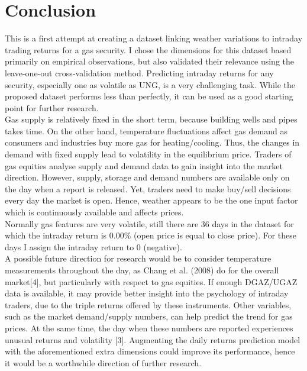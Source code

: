 \documentclass[conference,letterpaper]{IEEEtran}
\begin{document}
\section{Conclusion}
This is a first attempt at creating a dataset linking weather variations to intraday trading returns for a gas security. I chose the dimensions for this
dataset based primarily on empirical observations, but also validated their relevance using the leave-one-out cross-validation method. Predicting intraday
returns for any security, especially one as volatile as UNG, is a very challenging task. While the proposed dataset performs less than perfectly, it can be
used as a good starting point for further research. \\
\indent Gas supply is relatively fixed in the short term, because building wells and pipes takes time. On the other hand,
temperature fluctuations affect gas demand as consumers and industries buy more gas for heating/cooling. Thus, the changes in demand with fixed
supply lead to volatility in the equilibrium price. Traders of gas equities analyse supply and demand data to gain insight into the market direction. However,
supply, storage and demand numbers are available only on the day when a report is released. Yet, traders need to make buy/sell decisions every day the market
is open. Hence, weather appears to be the one input factor which is continuously available and affects prices. \\
Normally gas features are very volatile, still there are 36 days in the dataset
for which the intraday return is 0.00\% (open price is equal to close price). For these
days I assign the intraday return to 0 (negative).\\
\indent A possible future direction for research would be to consider temperature measurements throughout the day, as Chang et al. (2008) do for the overall market[4], but
particularly with respect to gas equities. If enough DGAZ/UGAZ data is available, it may provide better insight into the psychology of intraday traders, due to the triple
returns offered by these instruments. Other variables, such as the market demand/supply numbers, can help predict the trend for gas prices. At the same time, the
day when these numbers are reported experiences unusual returns and volatility [3]. Augmenting the daily returns prediction model with the aforementioned extra
dimensions could improve its performance, hence it would be a worthwhile direction of further research. \\

\end{document}
